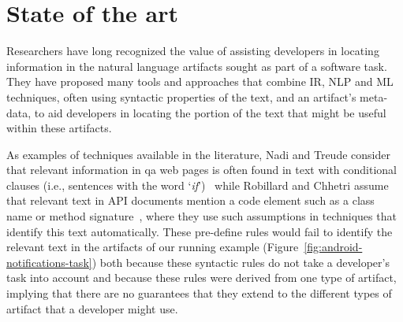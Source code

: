 \section{State of the art}
\label{cp1:novelty}


Researchers have long recognized the value of 
assisting developers in locating information in the natural language artifacts sought as part of a software task.
They have proposed many tools and approaches 
that combine \acf{IR}, \acf{NLP} and \acf{ML} techniques,
often using  syntactic properties of the text, and an artifact's meta-data,
to aid developers in locating the portion of the text that
might be useful within these artifacts.






As examples of techniques available in the literature, Nadi and Treude consider 
that relevant information in \acs{qa} 
web pages is often found in text with
conditional clauses (i.e., sentences with the word `\textit{if}')~\cite{nadi2020}
while Robillard and Chhetri assume that relevant 
text in API documents mention a code element such as a class name or method signature~\cite{Robillard2015},
where they use such assumptions 
in techniques that identify this text automatically.
These pre-define rules would fail to identify the relevant text in the artifacts of our running example
(Figure~\ref{fig:android-notifications-task})
both because these syntactic rules 
do not take a developer's task into account 
and because these rules were derived from one type of artifact,
implying that there are no guarantees that 
they extend to the different types of artifact
that a developer might use.





